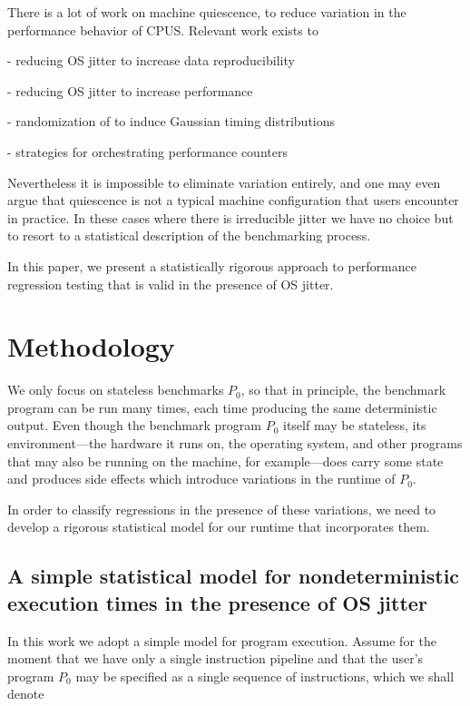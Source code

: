 \documentclass[conference]{IEEEtran}
\begin{document}
There is a lot of work on machine quiescence, to reduce variation in the performance
behavior of CPUS. Relevant work exists to

- reducing OS jitter to increase data reproducibility

- reducing OS jitter to increase performance

- randomization of  to induce Gaussian timing distributions

- strategies for orchestrating performance counters

Nevertheless it is impossible to eliminate variation
entirely, and one may even argue that quiescence is not a typical machine
configuration that users encounter in practice.
In these cases where there is irreducible jitter we have no choice but to resort to a statistical description of the benchmarking process.

In this paper, we present a statistically rigorous approach to performance regression
testing that is valid in the presence of OS jitter.




\section{Methodology}

We only focus on stateless benchmarks $P_0$, so that in principle, the benchmark program can be run many times, each time producing the same deterministic output. Even though the benchmark program $P_0$ itself may be stateless, its environment---the hardware it runs on, the operating system, and other programs that may also be running on the machine, for example---does carry some state and produces side effects which introduce variations in the runtime of $P_0$.

In order to classify regressions in the presence of these variations, we need to develop a rigorous statistical model for our runtime that incorporates them.

\label{sec:statmodel}
\subsection{A simple statistical model for nondeterministic execution times in the presence of OS jitter}

In this work we adopt a simple model for program execution. Assume for the moment that we have only a single instruction pipeline and that the user's program $P_0$ may be specified as a single sequence of instructions, which we shall denote
\end{document}
